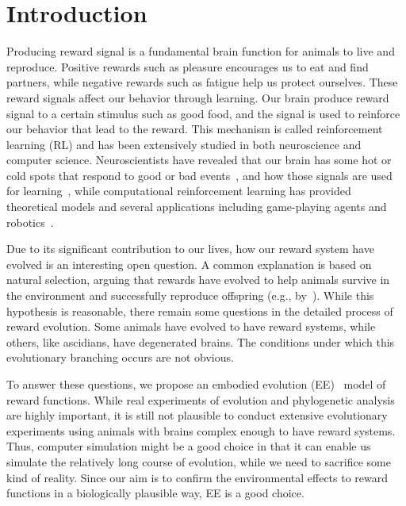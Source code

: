 \section{Introduction}

Producing reward signal is a fundamental brain function for animals to live and reproduce. Positive rewards such as pleasure encourages us to eat and find partners, while negative rewards such as fatigue help us protect ourselves. These reward signals affect our behavior through learning. Our brain produce reward signal to a certain stimulus such as good food, and the signal is used to reinforce our behavior that lead to the reward. This mechanism is called reinforcement learning (RL) and has been extensively studied in both neuroscience and computer science. Neuroscientists have revealed that our brain has some hot or cold spots that respond to good or bad events~\citep{berridgeAffectiveNeurosciencePleasure2008}, and how those signals are used for learning~\citep{schultzNeuronalRewardDecision2015}, while computational reinforcement learning has provided theoretical models and several applications including game-playing agents and robotics~\citep{suttonReinforcementLearningIntroduction2018}.

Due to its significant contribution to our lives, how our reward system have evolved is an interesting open question. A common explanation is based on natural selection, arguing that rewards have evolved to help animals survive in the environment and successfully reproduce offspring (e.g., by~\cite{schultzNeuronalRewardDecision2015}). While this hypothesis is reasonable, there remain some questions in the detailed process of reward evolution. Some animals have evolved to have reward systems, while others, like ascidians, have degenerated brains. The conditions under which this evolutionary branching occurs are not obvious.


To answer these questions, we propose an embodied evolution (EE)~\cite{watsonEmbodiedEvolutionDistributing2002} model of reward functions. While real experiments of evolution and phylogenetic analysis are highly important, it is still not plausible to conduct extensive evolutionary experiments using animals with brains complex enough to have reward systems. Thus, computer simulation might be a good choice in that it can enable us simulate the relatively long course of evolution, while we need to sacrifice some kind of reality. Since our aim is to confirm the environmental effects to reward functions in a biologically plausible way, EE is a good choice.

